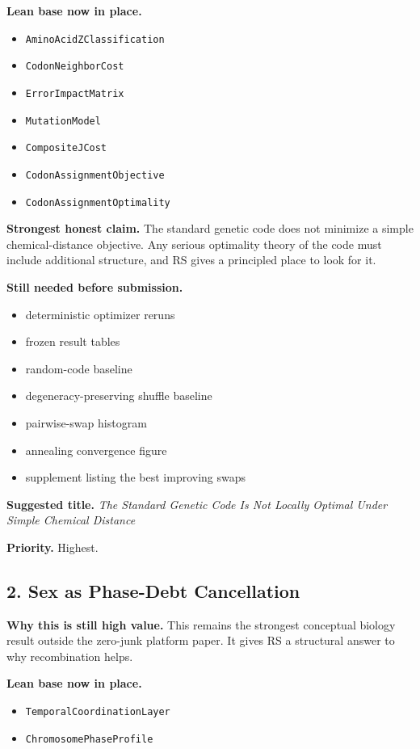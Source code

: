 \documentclass[11pt]{article}
\begin{document}
\textbf{Lean base now in place.}
\begin{itemize}
\item \texttt{AminoAcidZClassification}
\item \texttt{CodonNeighborCost}
\item \texttt{ErrorImpactMatrix}
\item \texttt{MutationModel}
\item \texttt{CompositeJCost}
\item \texttt{CodonAssignmentObjective}
\item \texttt{CodonAssignmentOptimality}
\end{itemize}

\textbf{Strongest honest claim.} The standard genetic code does not minimize a simple chemical-distance objective. Any serious optimality theory of the code must include additional structure, and RS gives a principled place to look for it.

\textbf{Still needed before submission.}
\begin{itemize}
\item deterministic optimizer reruns
\item frozen result tables
\item random-code baseline
\item degeneracy-preserving shuffle baseline
\item pairwise-swap histogram
\item annealing convergence figure
\item supplement listing the best improving swaps
\end{itemize}

\textbf{Suggested title.} \emph{The Standard Genetic Code Is Not Locally Optimal Under Simple Chemical Distance}

\textbf{Priority.} Highest.

\subsection*{2. Sex as Phase-Debt Cancellation}
\textbf{Why this is still high value.} This remains the strongest conceptual biology result outside the zero-junk platform paper. It gives RS a structural answer to why recombination helps.

\textbf{Lean base now in place.}
\begin{itemize}
\item \texttt{TemporalCoordinationLayer}
\item \texttt{ChromosomePhaseProfile}
\end{itemize}
\end{document}
